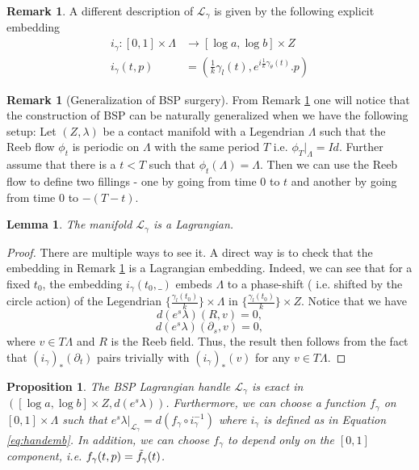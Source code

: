 \documentclass[11pt, oneside,dvipsnames]{amsart}
\renewcommand{\to}{\rightarrow}
\newcommand{\inv}{^{-1}}
\renewcommand{\to}{\rightarrow}
\newcommand{\<}{\langle}
\renewcommand{\>}{\rangle}
\newcommand{\cL}{\mathcal{L}}
\renewcommand{\to}{\rightarrow}
\newtheorem{lemma}[Theorem]{Lemma}
\newtheorem{prop}[Theorem]{Proposition}
\theoremstyle{definition}
\theoremstyle{definition}
\newtheorem{remark}[Theorem]{Remark}
\numberwithin{equation}{subsection}
\begin{document}
\begin{remark}\label{rem:emb}
    A different description of $\cL_\gamma$ is given by the following explicit embedding
    \begin{align}\label{eq:handemb}      
    i_\gamma:[0,1]\times \Lambda &\to [\log a, \log b] \times Z \\
     i_\gamma(t,p) &= \left(\frac{1}{k}\gamma_l (t),e^{i\frac{1}{k}\gamma_\theta (t)}.p\right)
    \end{align}
\end{remark}


\begin{remark}[Generalization of BSP surgery]
    From  Remark \ref{rem:emb} one will notice that the construction of BSP can be naturally generalized when we have the following setup:
    Let $(Z,\lambda)$ be a contact manifold with a Legendrian $\Lambda$ such that the Reeb flow $\phi_t$ is periodic on $\Lambda$ with the same period $T$ i.e. $\phi_T|_{\Lambda} = Id$.  Further assume that there is a $t<T$ such that $\phi_t(\Lambda) = \Lambda$. Then we can use the Reeb flow  to define two fillings - one by going from time $0$ to $t$ and another by going from time $0$ to $-(T-t)$.
\end{remark}



\begin{lemma}
    The manifold $\cL_\gamma$ is a Lagrangian.
\end{lemma}
\begin{proof}
    There are multiple ways to see it. A direct way is to check that the embedding in Remark \ref{rem:emb} is a Lagrangian embedding. Indeed, we can see that for a fixed $t_0$, the embedding $i_\gamma(t_0,\_ )$ embeds $\Lambda$ to a phase-shift ( i.e. shifted by the circle action) of the Legendrian $\{\frac{\gamma_l(t_0)}{k}\} \times \Lambda$ in $\{\frac{\gamma_l(t_0)}{k}\}\times Z$.  Notice that we have $$d(e^s\lambda) (R,v) = 0,$$  $$d(e^s\lambda) (\partial_s,v)=0,$$ where $v \in T\Lambda$ and $R$ is the Reeb field. Thus, the result then follows from  the fact that  $(i_\gamma)_* (\partial_t)$ pairs trivially with $(i_\gamma)_* (v)$ for any $v\in T\Lambda$.
\end{proof}
\begin{prop}\label{prop:exact_in_neck}
    The BSP Lagrangian handle $\cL_\gamma$ is exact in $([\log a, \log b] \times Z, d(e^s\lambda))$. Furthermore, we can choose a function $f_\gamma$ on $[0,1]\times \Lambda$ such that $e^s\lambda|_{\cL_\gamma} = d (f_\gamma \circ i_\gamma\inv)$ where $i_\gamma $ is defined as in Equation \ref{eq:handemb}. In addition, we can choose $f_\gamma$ to depend only on the $[0,1]$ component, i.e.
    $f_\gamma (t,p) = \Tilde{f}_\gamma(t)$.
\end{prop}
\end{document}
